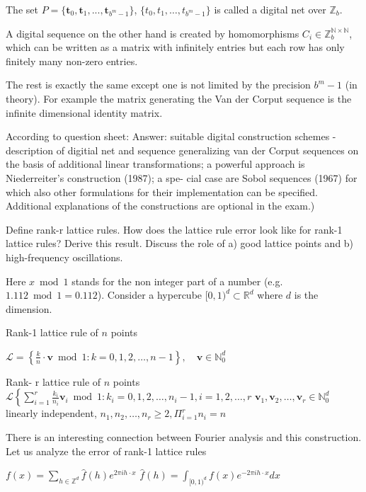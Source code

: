 The set \( P = \{\mathbf{t}_0, \mathbf{t}_1, ..., \mathbf{t}_{b^m - 1}\} \), \( \{t_0, t_1, \dots, t_{b^m - 1}\}\) is called a digital net over \(\mathbb{Z}_b\). 

A digital sequence on the other hand is created by homomorphisms \( C_i \in \mathbb{Z}^{\mathbb{N} \times \mathbb{N}}_b \),
which can be written as a matrix with infinitely entries but each row has only finitely many non-zero entries.

The rest is exactly the same except one is not limited by the precision \( b^m - 1 \) (in theory).
For example the matrix generating the Van der Corput sequence is the infinite dimensional identity matrix.

According to question sheet:
Answer: suitable digital construction schemes - description of digitial net and
sequence generalizing van der Corput sequences on the basis of additional linear
transformations; a powerful approach is Niederreiter’s construction (1987); a spe-
cial case are Sobol sequences (1967) for which also other formulations for their
implementation can be specified. Additional explanations of the constructions are
optional in the exam.)


Define rank-r lattice rules. How does the lattice rule error look like for rank-1
lattice rules? Derive this result. Discuss the role of a) good lattice points and b)
high-frequency oscillations.

Here \( x \bmod 1 \) stands for the non integer part of a number (e.g. \( 1.112 \bmod 1 = 0.112\)).
Consider a hypercube \( [0, 1)^d \subset \mathbb{R}^d \) where \( d \) is the dimension.

Rank-1 lattice rule of \( n \) points

\( \mathcal{L} = \left\{ \frac{k}{n} \cdot \mathbf{v} \bmod 1 : k = 0, 1, 2, \dots, n - 1 \right\}, \quad \mathbf{v} \in \mathbb{N}_0^d \)

Rank- r lattice rule of \( n \) points
\( \mathcal{L} \left\{ \sum_{i=1}^r \frac{k_i}{n_i} \mathbf{v}_i \bmod 1 : k_i = 0, 1, 2, \dots, n_i - 1, i = 1, 2, \dots, r\)
\( \mathbf{v}_1, \mathbf{v}_2, \dots, \mathbf{v}_r \in \mathbb{N}_0^d\) linearly independent, \(n_1, n_2, \dots, n_r \geq 2, \Pi_{i=1}^r n_i = n \)


There is an interesting connection between Fourier analysis and this construction.
Let us analyze the error of rank-1 lattice rules

\( f(x) = \sum_{h \in \mathbb{Z}^d} \hat{f}(h) e^{2 \pi i h \cdot x} \)
\( \hat{f}(h) = \int_{[0,1)^d} f(x) e^{-2 \pi i h \cdot x} dx \)

